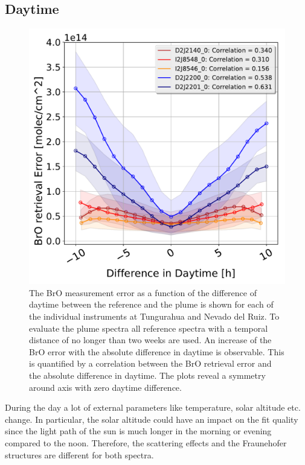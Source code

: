 \subsection{ Daytime \label{chap:daytime}}
	\begin{figure}
	\centering
	\includegraphics[width=0.7\linewidth]{Bilder/DiffDaytimeallInstruments}
	\caption{The BrO measurement error as a function of the difference of daytime between the reference and the plume is shown for each of the individual instruments at Tungurahua and Nevado del Ruiz. To evaluate the plume spectra all reference spectra with a temporal distance of no longer than two weeks are used. An increase of the BrO error with the absolute difference in daytime is observable. This is quantified by a correlation between the BrO retrieval error and the absolute difference in daytime. The plots reveal a symmetry around axis with zero daytime difference. }
	\label{fig:diffdaytime}
\end{figure}
During the day a lot of external parameters like temperature, solar altitude etc. change. In particular, the solar altitude could have an impact on the fit quality since the light path of the sun is much longer in the morning or evening compared to the noon. Therefore, the scattering effects and the Fraunehofer structures are different for both spectra.\\

